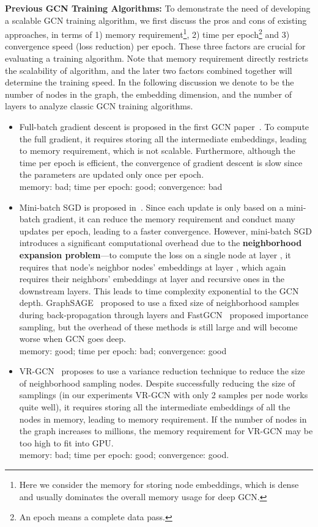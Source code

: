 \documentclass[sigconf]{acmart}
\begin{document}
{\bf Previous GCN Training Algorithms:  } 
To demonstrate the need of developing a scalable GCN training algorithm, we first discuss the pros and cons of existing approaches, in terms of 1) memory requirement{\footnote{Here we consider the memory for storing node embeddings, which is dense and usually dominates the overall memory usage for deep GCN.}}, 2) time per epoch\footnote{An epoch means a complete data pass. } and 3) convergence speed  (loss reduction) per epoch. These three factors are crucial for evaluating a training algorithm. Note that memory requirement directly restricts the scalability of algorithm, and the later two factors combined together will determine the training speed. In the following discussion we denote  to be the number of nodes in the graph,  the embedding dimension, and  the number of layers to analyze classic GCN training algorithms. 
\begin{itemize}
\item Full-batch gradient descent is proposed in the first GCN paper~\cite{kipf2017semi}. To compute the full gradient, it requires storing all the intermediate embeddings, leading to  memory requirement, which is not scalable. Furthermore, although the time per epoch is efficient, the convergence of gradient descent is slow since the parameters are updated only once per epoch.\\
memory: bad; time per epoch: good; convergence: bad
\item Mini-batch SGD is proposed in~\cite{hamilton2017inductive}. Since each update is only based on a mini-batch gradient, it can reduce the memory requirement and conduct many updates per epoch, leading to a faster convergence. However, mini-batch SGD introduces a significant computational overhead due to the {\bf neighborhood expansion problem}---to compute the loss on a single node at layer , it requires that node's neighbor nodes' embeddings at layer , which again requires their neighbors' embeddings at layer  and recursive ones in the downstream layers. This leads to time complexity exponential to the GCN depth. GraphSAGE~\cite{hamilton2017inductive} proposed to use a fixed size of neighborhood samples during back-propagation through layers and FastGCN~\cite{chen2018fastgcn}  proposed importance sampling, but the overhead of these methods is still large and will become worse when GCN goes deep.\\
memory: good; time per epoch: bad; convergence: good
 \item VR-GCN~\cite{chen2018stochastic} proposes to use a variance reduction technique to reduce the size of neighborhood sampling nodes. Despite successfully reducing the size of samplings (in our experiments VR-GCN with only 2 samples per node works quite well), it requires storing all the intermediate embeddings of all the nodes in memory, leading to  memory requirement.
 If the number of nodes in the graph increases to millions, the memory requirement for VR-GCN may be too high to fit into GPU. 
 \\
 {memory: bad; time per epoch: good; convergence: good.}
\end{itemize}
\end{document}
